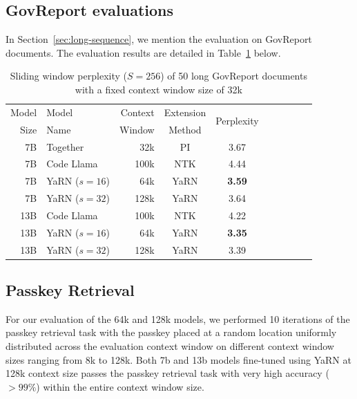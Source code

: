 \documentclass{article} %
\begin{document}
\subsection{GovReport evaluations}\label{appendix:govreport}
In Section~\ref{sec:long-sequence}, we mention the evaluation on GovReport documents. The evaluation results are detailed in Table~\ref{tab:govreport} below.
\begin{table}[H]
    \centering
    \begin{tabular}{rlrccccccc}
        \toprule
        Model & Model & Context & Extension & \multirow{2}{*}{Perplexity}  \\
         Size &  Name &  Window &    Method  \\
        \midrule
          7B &      Together &  32k &   PI & 3.67 \\
          7B &    Code Llama & 100k &  NTK & 4.44 \\
          7B & YaRN ($s=16$) &  64k & YaRN & {\bf 3.59} \\
          7B & YaRN ($s=32$) & 128k & YaRN & 3.64 \\
        \midrule
         13B &    Code Llama & 100k &  NTK & 4.22 \\
         13B & YaRN ($s=16$) &  64k & YaRN & {\bf 3.35} \\
         13B & YaRN ($s=32$) & 128k & YaRN & 3.39 \\        
        \bottomrule
    \end{tabular}
    \caption{\small Sliding window perplexity ($S=256$) of 50 long GovReport documents with a fixed context window size of 32k}
    \label{tab:govreport}
\end{table}

\subsection{Passkey Retrieval}\label{appendix:passkey}

For our evaluation of the 64k and 128k models, we performed 10 iterations of the passkey retrieval task with the passkey placed at a random location uniformly distributed across the evaluation context window on different context window sizes ranging from 8k to 128k. Both 7b and 13b models fine-tuned using YaRN at 128k context size passes the passkey retrieval task with very high accuracy ($>99\%$) within the entire context window size.
\end{document}
